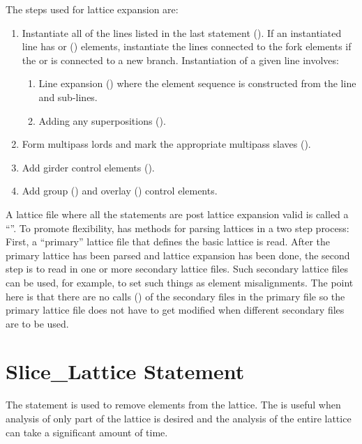 {{{The steps used for lattice expansion are:
\begin{enumerate}
\item
Instantiate all of the lines listed in the last  statement (). If an instantiated line has
 or  () elements, instantiate the lines connected to the fork
elements if the  or  is connected to a new branch. Instantiation of a given
line involves:
\begin{enumerate}
\item
Line expansion () where the element sequence is constructed from the line and sub-lines.
\item
Adding any superpositions ().
\end{enumerate}
\item
Form multipass lords and mark the appropriate multipass slaves ().
\item
Add girder control elements ().
\item
Add group () and overlay () control elements.
\end{enumerate}

A lattice file where all the statements are post lattice expansion valid is called a ``''.  To promote flexibility, \bmad has methods for parsing lattices in a two step
process: First, a ``primary'' lattice file that defines the basic lattice is read. After the primary
lattice has been parsed and lattice expansion has been done, the second step is to read in one or
more secondary lattice files. Such secondary lattice files can be used, for example, to set such
things as element misalignments. The point here is that there are no calls () of the
secondary files in the primary file so the primary lattice file does not have to get modified when
different secondary files are to be used.

\section{Slice_Lattice Statement}

The  statement is used to remove elements from the lattice. The 
is useful when analysis of only part of the lattice is desired and the analysis of the entire
lattice can take a significant amount of time.

}}}
